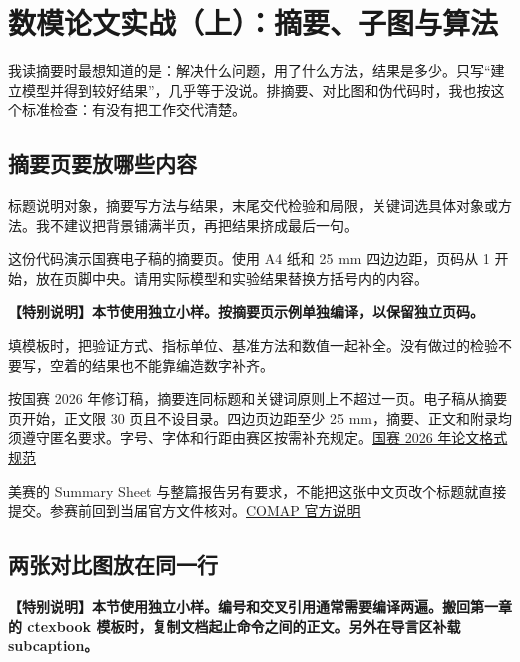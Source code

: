 \chapter{数模论文实战（上）：摘要、子图与算法}

我读摘要时最想知道的是：解决什么问题，用了什么方法，结果是多少。只写“建立模型并得到较好结果”，几乎等于没说。排摘要、对比图和伪代码时，我也按这个标准检查：有没有把工作交代清楚。

\section{摘要页要放哪些内容}

标题说明对象，摘要写方法与结果，末尾交代检验和局限，关键词选具体对象或方法。我不建议把背景铺满半页，再把结果挤成最后一句。

这份代码演示国赛电子稿的摘要页。使用 A4 纸和 25 mm 四边边距，页码从 1 开始，放在页脚中央。请用实际模型和实验结果替换方括号内的内容。

\begin{tcolorbox}[colback=Teal!4,colframe=Teal,boxrule=.7pt,arc=1mm,fontupper=\small\bfseries]\textbf{【特别说明】本节使用独立小样。按摘要页示例单独编译，以保留独立页码。}\end{tcolorbox}


填模板时，把验证方式、指标单位、基准方法和数值一起补全。没有做过的检验不要写，空着的结果也不能靠编造数字补齐。

按国赛 2026 年修订稿，摘要连同标题和关键词原则上不超过一页。电子稿从摘要页开始，正文限 30 页且不设目录。四边页边距至少 25 mm，摘要、正文和附录均须遵守匿名要求。字号、字体和行距由赛区按需补充规定。\href{https://www.mcm.edu.cn/html_cn/node/4cd596519c9eb9fbd866398f6df0caa3.html}{国赛 2026 年论文格式规范}

美赛的 Summary Sheet 与整篇报告另有要求，不能把这张中文页改个标题就直接提交。参赛前回到当届官方文件核对。\href{https://www.contest.comap.com/undergraduate/contests/mcm/instructions.html}{COMAP 官方说明}

\section{两张对比图放在同一行}

\begin{tcolorbox}[colback=Teal!4,colframe=Teal,boxrule=.7pt,arc=1mm,fontupper=\small\bfseries]\textbf{【特别说明】本节使用独立小样。编号和交叉引用通常需要编译两遍。搬回第一章的 ctexbook 模板时，复制文档起止命令之间的正文。另外在导言区补载 subcaption。}\end{tcolorbox}

